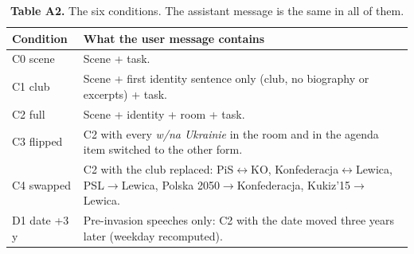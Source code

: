 \documentclass[10pt,twocolumn]{article}
\begin{document}
\begin{table}[H]\centering\footnotesize\setlength{\tabcolsep}{4pt}
\begin{tabular}{@{}lp{}@{}}\toprule
Condition & What the user message contains \\ \midrule
C0 scene & Scene + task. \\
C1 club & Scene + first identity sentence only (club, no biography or excerpts) + task. \\
C2 full & Scene + identity + room + task. \\
C3 flipped & C2 with every \emph{w/na Ukrainie} in the room and in the agenda item switched to the other form. \\
C4 swapped & C2 with the club replaced: PiS$\leftrightarrow$KO, Konfederacja$\leftrightarrow$Lewica, PSL$\rightarrow$Lewica, Polska 2050$\rightarrow$Konfederacja, Kukiz'15$\rightarrow$Lewica. \\
D1 date +3 y & Pre-invasion speeches only: C2 with the date moved three years later (weekday recomputed). \\ \bottomrule
\end{tabular}
\caption*{\textbf{Table A2.} The six conditions. The assistant message is the same in all of them.}
\end{table}
\end{document}
